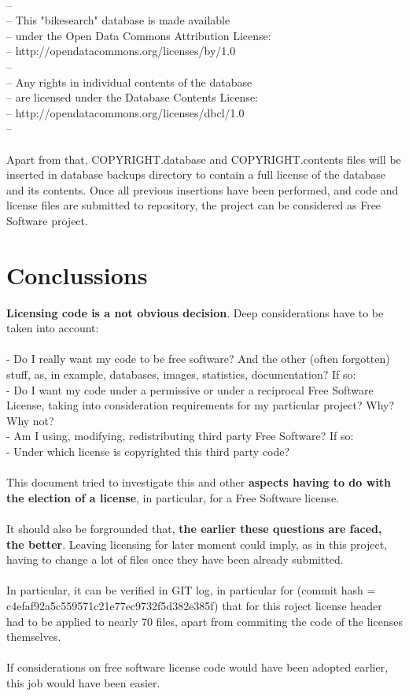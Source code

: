 \documentclass[11pt]{article}
\begin{document}
\\
--\\
-- This "bikesearch" database is made available \\
-- under the Open Data Commons Attribution License: \\ 
-- http://opendatacommons.org/licenses/by/1.0 \\
--\\
-- Any rights in individual contents of the database \\
-- are licensed under the Database Contents License: \\
-- http://opendatacommons.org/licenses/dbcl/1.0 \\
--\\
\\
Apart from that, COPYRIGHT.database and COPYRIGHT.contents files will be inserted in database backups directory to contain a full license of the database and its contents. Once all previous insertions have been performed, and code and license files are submitted to repository, the project can be considered as Free Software project.

\section{Conclussions}

\textbf{Licensing code is a not obvious decision}. Deep considerations have to be taken into account:\\
\\
- Do I really want my code to be free software? And the other (often forgotten) stuff, as, in example, databases, images, statistics, documentation? If so:\\
- Do I want my code under a permissive or under a reciprocal Free Software License, taking into consideration requirements for my particular project? Why? Why not?\\
- Am I using, modifying, redistributing third party Free Software? If so:\\
- Under which license is copyrighted this third party code?\\
\\
This document tried to investigate this and other \textbf{aspects having to do with the election of a license}, in particular, for a Free Software license.\\
\\
It should also be forgrounded that, \textbf{the earlier these questions are faced, the better}. Leaving licensing for later moment could imply, as in this project, having to change a lot of files once they have been already submitted.\\ 
\\
In particular, it can be verified in GIT log, in particular for (commit hash = c4efaf92a5c559571c21e77ec9732f5d382e385f) that for this roject license header had to be applied to nearly 70 files, apart from commiting the code of the licenses themselves.\\
\\
If considerations on free software license code would have been adopted earlier, this job would have been easier.
\end{document}

